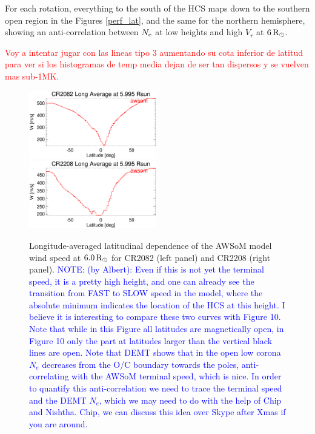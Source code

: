 \documentclass[namedreferences]{solarphysics}
\newcommand{\mrsun}{{\rm R_\odot}}
\newcommand{\Ne}{N_{\rm e}}
\def\diego#1{\textcolor{red}{#1}}
\def\notebyalbert#1{\textcolor{blue}{NOTE: #1}}
\begin{document}
\begin{article}
For each rotation, everything to the south of the HCS maps down to the southern open region in the Figures \ref{perf_lat}, and the same for the northern hemisphere, showing an anti-correlation between $\Ne$ at low heights and high $V_r$ at $6\,\mrsun$.

\diego{Voy a intentar jugar con las lineas tipo 3 aumentando su cota inferior de latitud para ver si los histogramas de temp media dejan de ser tan dispersos y se vuelven mas sub-1MK. }

\begin{figure}[h!]
\begin{center}
\includegraphics[width=0.495\textwidth]{figs/Perfil_Vr_2082_5995.eps}
\includegraphics[width=0.495\textwidth]{figs/Perfil_Vr_2208_5995.eps}
\caption{{Longitude-averaged latitudinal dependence of the AWSoM model wind speed at $6.0\,\mrsun$ for CR2082 (left panel) and CR2208 (right panel).} \notebyalbert{(by Albert): Even if this is not yet the terminal speed, it is a pretty high height, and one can already see the transition from FAST to SLOW speed in the model, where the absolute minimum indicates the location of the HCS at this height. I believe it is interesting to compare these two curves with Figure 10. Note that while in this Figure all latitudes are magnetically open, in Figure 10 only the part at latitudes larger than the vertical black lines are open. Note that DEMT shows that in the open low corona $N_e$ decreases from the O/C boundary towards the poles, anti-correlating with the AWSoM terminal speed, which is nice. In order to quantify this anti-correlation we need to trace the terminal speed and the DEMT $N_e$, which we may need to do with the help of Chip and Nishtha. Chip, we can discuss this idea over Skype after Xmas if you are around.}}
\label{perf_lon_vr}
\end{center}
\end{figure}


\end{article}
\end{document}

